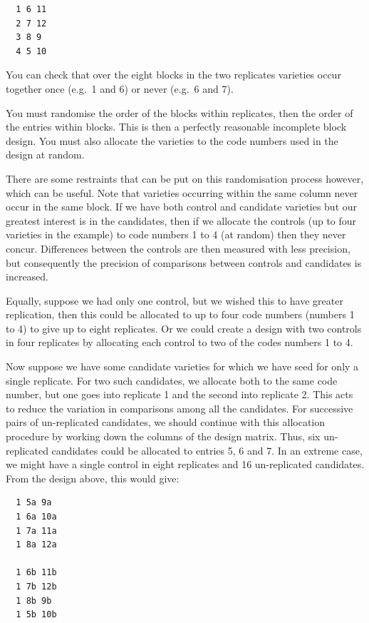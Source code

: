 \documentclass[
]{book}
\begin{document}
\begin{verbatim}
  1 6 11
  2 7 12
  3 8 9
  4 5 10
\end{verbatim}

You can check that over the eight blocks in the two replicates varieties occur together once (e.g.~1 and 6) or never (e.g.~6 and 7).

You must randomise the order of the blocks within replicates, then the order of the entries within blocks. This is then a perfectly reasonable incomplete block design.
You must also allocate the varieties to the code numbers used in the design at random.

There are some restraints that can be put on this randomisation process however, which can be useful. Note that varieties occurring within the same column never occur in the same block. If we have both control and candidate varieties but our greatest interest is in the candidates, then if we allocate the controls (up to four varieties in the example) to code numbers 1 to 4 (at random) then they never concur. Differences between the controls are then measured with less precision, but consequently the precision of comparisons between controls and candidates is increased.

Equally, suppose we had only one control, but we wished this to have greater replication, then this could be allocated to up to four code numbers (numbers 1 to 4) to give up to eight replicates. Or we could create a design with two controls in four replicates by allocating each control to two of the codes numbers 1 to 4.

Now suppose we have some candidate varieties for which we have seed for only a single replicate. For two such candidates, we allocate both to the same code number, but one goes into replicate 1 and the second into replicate 2. This acts to reduce the variation in comparisons among all the candidates. For successive pairs of un-replicated candidates, we should continue with this allocation procedure by working down the columns of the design matrix. Thus, six un-replicated candidates could be allocated to entries 5, 6 and 7. In an extreme case, we might have a single control in eight replicates and 16 un-replicated candidates. From the design above, this would give:

\begin{verbatim}
  1 5a 9a 
  1 6a 10a
  1 7a 11a
  1 8a 12a    

  1 6b 11b
  1 7b 12b
  1 8b 9b
  1 5b 10b
\end{verbatim}
\end{document}
